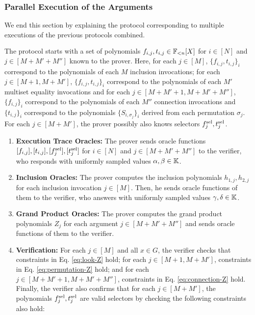 \subsubsection*{Parallel Execution of the Arguments}

We end this section by explaining the protocol corresponding to multiple executions of the previous protocols combined.
\begin{protocol}\label{prot:extended-plookup}
The protocol starts with a set of polynomials $f_{i,j},t_{i,j} \in \mathbb{F}_{<n}[X]$ for $i\in[N]$ and $j\in[M+M'+M'']$ known to the prover. Here, for each $j \in [M]$, $\{f_{i,j},t_{i,j}\}_i$ correspond to the polynomials of each $M$ inclusion invocations; for each $j \in [M+1,M+M']$, $\{f_{i,j},t_{i,j}\}_i$ correspond to the polynomials of each $M'$ multiset equality invocations and for each $j \in [M+M'+1,M+M'+M'']$, $\{f_{i,j}\}_i$ correspond to the polynomials of each $M''$ connection invocations and $\{t_{i,j}\}_i$ correspond to the polynomials $\{S_{i,\sigma_{j}}\}_i$ derived from each permutation $\sigma_j$. For each $j \in [M+M']$, the prover possibly also knows selectors $f^{\text{sel}}_j,t^{\text{sel}}_j$.
\begin{enumerate}
  \item \textbf{Execution Trace Oracles:} The prover sends oracle functions $[f_{i,j}],[t_{i,j}],[f^{\text{sel}}_j],[t^{\text{sel}}_j]$ for $i\in[N]$ and $j\in[M+M'+M'']$ to the verifier, who responds with uniformly sampled values $\alpha,\beta \in \mathbb{K}$.
  \item \textbf{Inclusion Oracles:} The prover computes the inclusion polynomials $h_{1,j},h_{2,j}$ for each inclusion invocation $j \in [M]$. Then, he sends oracle functions of them to the verifier, who answers with uniformly sampled values $\gamma,\delta \in \mathbb{K}$.
  \item \textbf{Grand Product Oracles:} The prover computes the grand product polynomials $Z_j$ for each argument $j \in [M+M'+M'']$ and sends oracle functions of them to the verifier.
  \item \textbf{Verification:} For each $j \in [M]$ and all $x \in G$, the verifier checks that constraints in Eq. \eqref{eq:look-Z} hold; for each $j \in [M+1,M+M']$, constraints in Eq. \eqref{eq:permutation-Z} hold; and for each $j \in [M+M'+1,M+M'+M'']$, constraints in Eq. \eqref{eq:connection-Z} hold. Finally, the verifier also confirms that for each $j \in [M+M']$, the polynomials $f^{\text{sel}}_j,t^{\text{sel}}_j$ are valid selectors by checking the following constraints also hold:

\end{enumerate}
\end{protocol}

